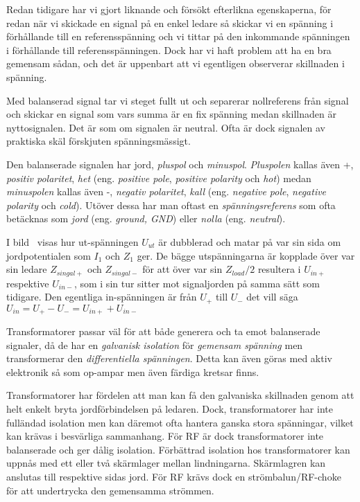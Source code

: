Redan tidigare har vi gjort liknande och försökt efterlikna egenskaperna, för
redan när vi skickade en signal på en enkel ledare så skickar vi en spänning
i förhållande till en referensspänning och vi tittar på den inkommande
spänningen i förhållande till referensspänningen.
Dock har vi haft problem att ha en bra gemensam sådan, och det är uppenbart
att vi egentligen observerar skillnaden i spänning.

Med balanserad signal tar vi steget fullt ut och separerar nollreferens från
signal och skickar en signal som vars summa är en fix spänning medan
skillnaden är nyttosignalen.
Det är som om signalen är neutral.
Ofta är dock signalen av praktiska skäl förskjuten spänningsmässigt.

Den balanserade signalen har jord, \emph{pluspol} och \emph{minuspol}.
\emph{Pluspolen} kallas även +, \emph{positiv polaritet}, \emph{het} (eng.
\emph{positive pole}, \emph{positive polarity} och \emph{hot}) medan
\emph{minuspolen} kallas även -, \emph{negativ polaritet}, \emph{kall} (eng.
\emph{negative pole}, \emph{negative polarity} och \emph{cold}).
Utöver dessa har man oftast en \emph{spänningsreferens} som ofta betäcknas som
\emph{jord} (eng. \emph{ground, GND}) eller \emph{nolla} (eng.
\emph{neutral}).

I bild~ visas hur ut-spänningen \(U_{ut}\) är dubblerad och
matar på var sin sida om jordpotentialen som  \(I_{1}\) och \(Z_{1}\) ger.
De bägge utspänningarna är kopplade över var sin ledare \(Z_{singal+}\) och
\(Z_{singal-}\) för att över var sin \(Z_{load}/2\) resultera i \(U_{in+}\)
respektive \(U_{in-}\), som i sin tur sitter mot signaljorden på samma sätt
som tidigare.
Den egentliga in-spänningen är från \(U_{+}\) till \(U_{-}\) det vill säga
\(U_{in} = U_{+} - U_{-} = U_{in+}+U_{in-}\)

Transformatorer passar väl för att både generera och ta emot balanserade
signaler, då de har en \emph{galvanisk isolation} för \emph{gemensam spänning}
men transformerar den \emph{differentiella spänningen}.
Detta kan även göras med aktiv elektronik så som op-ampar men även färdiga
kretsar finns.

Transformatorer har fördelen att man kan få den galvaniska skillnaden genom
att helt enkelt bryta jordförbindelsen på ledaren.
Dock, transformatorer har inte fulländad isolation men kan däremot ofta hantera
ganska stora spänningar, vilket kan krävas i besvärliga sammanhang.
För RF är dock transformatorer inte balanserade och ger dålig isolation.
Förbättrad isolation hos transformatorer kan uppnås med ett eller två
skärmlager mellan lindningarna.
Skärmlagren kan anslutas till respektive sidas jord.
För RF krävs dock en strömbalun/RF-choke för att undertrycka den
gemensamma strömmen.

